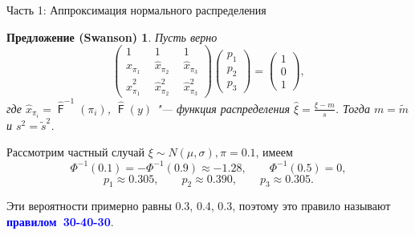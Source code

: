 \documentclass[ucs, notheorems, handout]{beamer}
\newtheorem{proposition}[theorem]{Предложение (Swanson)}
\DeclareMathOperator{\F}{\mathsf{F}}
\begin{document}
	\begin{frame}{Часть 1: Аппроксимация нормального распределения}
		\begin{proposition}\label{pr1}
			Пусть верно 
			\begin{equation*}
				\begin{pmatrix} 
					1&1&1\\ 
					\hat{x}_{\pi_{1}}~~ &  \hat{x}_{\pi_{2}}~~  & \hat{x}_{\pi_{3}} \\ 
					\hat{x}_{\pi_{1}}^{2}~~&\hat{x}_{\pi_{2}}^{2}~~  &\hat{x}_{\pi_{3}}^{2}
				\end{pmatrix}
				\begin{pmatrix}p_{1}\\p_{2}\\ p_{3}\end{pmatrix}= \begin{pmatrix}1\\0\\1 \end{pmatrix},\label{4}
			\end{equation*}
			где $\hat{x}_{\pi_{i}} = \hat{\F}^{-1}(\pi_{i})$, $\hat{\F}(y)$ "--- функция распределения $\displaystyle{\hat{\xi} = \frac{\xi-m}{s}}$. Тогда $m=\tilde{m}$ и $s^{2} = \tilde{s}^{2}$.
		\end{proposition}
	
	Рассмотрим частный случай $\xi\sim N(\mu, \sigma), \pi = 0.1$, имеем 
	$$\Phi ^{-1}(0.1) = -\Phi ^{-1}(0.9) \approx  -1.28, \qquad \Phi ^{-1}(0.5) = 0, $$
	$$p_{1}\approx 0.305, \qquad p_{2}\approx 0.390, \qquad p_{3}\approx 0.305.$$
	
	Эти вероятности примерно равны 0.3, 0.4, 0.3, поэтому это правило называют \textcolor{blue}{\hbox{\textbf{правилом 30-40-30}}}.
	
		
	\end{frame}
	
\end{document}
